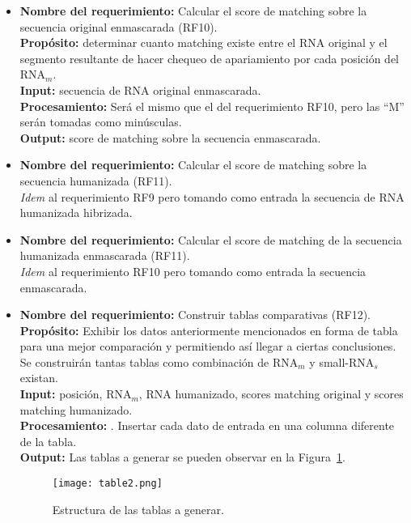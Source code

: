 \documentclass[12pt,a4paper,spanish]{article}
\begin{document}
\begin{itemize}
		\item \textbf{Nombre del requerimiento:} Calcular el score de matching sobre la secuencia original enmascarada 			(RF10).\\
 	    \textbf{Propósito:} determinar cuanto matching existe entre el RNA original y el segmento resultante de hacer 								chequeo de apariamiento por cada posición del RNA$_m$.\\
		\textbf{Input:} secuencia de RNA original enmascarada. \\
		\textbf{Procesamiento:} Será el mismo que el del requerimiento RF10, pero las ``M'' serán tomadas como 			 
        minúsculas.	\\
		\textbf{Output:} score de matching sobre la secuencia enmascarada.\\

		\item \textbf{Nombre del requerimiento:} Calcular el score de matching sobre la secuencia humanizada (RF11).\\
		\textit{Idem} al requerimiento RF9 pero tomando como entrada la secuencia de RNA humanizada hibrizada. \\

		\item \textbf{Nombre del requerimiento:} Calcular el score de matching de la secuencia humanizada enmascarada 			(RF11).\\
		\textit{Idem} al requerimiento RF10 pero tomando como entrada la secuencia enmascarada. \\	

		\item \textbf{Nombre del requerimiento:} Construir tablas comparativas (RF12).\\
 	    \textbf{Propósito:} Exhibir los datos anteriormente mencionados en forma de tabla para una mejor comparación y 								permitiendo así llegar a ciertas conclusiones. Se construirán tantas tablas como combinación 								de RNA$_m$ y small-RNA$_s$ existan.\\
		\textbf{Input:} posición, RNA$_m$, RNA humanizado, scores matching original y scores matching humanizado.\\
		\textbf{Procesamiento:} . Insertar cada dato de entrada en una columna diferente de la tabla.\\
		\textbf{Output:} Las tablas a generar se pueden observar en la Figura~\ref{table}.
			\vskip 0.5cm
			\begin{figure}[h]
				\begin{center}
					\texttt{[image: table2.png]}
					\caption{Estructura de las tablas a generar.}
					\label{table}
				\end{center}
			\end{figure}
		

\end{itemize}
\end{document}
